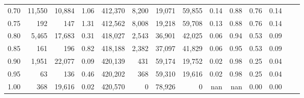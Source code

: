 \begin{tabular}{rrrrrrrrrrrrrr}
0.70 &  11,550 &  10,884 &      1.06 &  412,370 &    8,200 &  19,071 &  59,855 &  0.14 &  0.88 &  0.76 &      0.14 \\
0.75 &     192 &     147 &      1.31 &  412,562 &    8,008 &  19,218 &  59,708 &  0.13 &  0.88 &  0.76 &      0.14 \\
0.80 &   5,465 &  17,683 &      0.31 &  418,027 &    2,543 &  36,901 &  42,025 &  0.06 &  0.94 &  0.53 &      0.09 \\
0.85 &     161 &     196 &      0.82 &  418,188 &    2,382 &  37,097 &  41,829 &  0.06 &  0.95 &  0.53 &      0.09 \\
0.90 &   1,951 &  22,077 &      0.09 &  420,139 &      431 &  59,174 &  19,752 &  0.02 &  0.98 &  0.25 &      0.04 \\
0.95 &      63 &     136 &      0.46 &  420,202 &      368 &  59,310 &  19,616 &  0.02 &  0.98 &  0.25 &      0.04 \\
1.00 &     368 &  19,616 &      0.02 &  420,570 &        0 &  78,926 &       0 &   nan &   nan &  0.00 &      0.00 \\
\bottomrule
\end{tabular}

